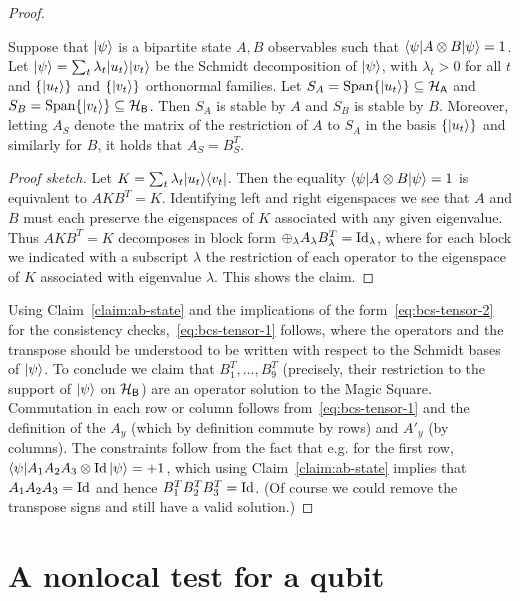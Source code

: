 \begin{proof}
\begin{claim}\label{claim:ab-state}
Suppose that $|\psi\rangle$ is a bipartite state $A,B$ observables such that $\langle\psi| A\otimes B |\psi\rangle = 1$. Let $|\psi\rangle = \sum_t \lambda_t |u_t\rangle |v_t\rangle$ be the Schmidt decomposition of $|\psi\rangle$, with $\lambda_t>0$ for all $t$ and $\{|u_t\rangle\}$ and $\{|v_t\rangle\}$ orthonormal families. Let  $S_A = \text{Span}\{|u_t\rangle\} \subseteq \mathcal{H}_{\textsf{A}}$ and $S_B=\text{Span}\{|v_t\rangle\} \subseteq \mathcal{H}_{\textsf{B}}$. Then $S_A$ is stable by $A$ and $S_B$ is stable by $B$. Moreover, letting $A_S$ denote the matrix of the restriction of $A$ to $S_A$ in the basis $\{|u_t\rangle\}$ and similarly for $B$, it holds that    $A_S=B_S^T$. 
\end{claim}

\begin{proof}[Proof sketch]
Let $K = \sum_t \lambda_t |u_t\rangle\langle v_t|$. Then the equality $\langle\psi| A\otimes B |\psi\rangle = 1$ is equivalent to $AKB^T = K$. Identifying left and right eigenspaces we see that $A$ and $B$ must each preserve the eigenspaces of $K$ associated with any given eigenvalue. Thus $AKB^T = K$ decomposes in block form $\oplus_\lambda  A_\lambda B_\lambda^T = \mathop{\rm Id}\nolimits_\lambda$, where for each block we indicated with a subscript $\lambda$ the restriction of each operator to the eigenspace of $K$ associated with eigenvalue $\lambda$. This shows the claim.  
\end{proof}

Using Claim~\ref{claim:ab-state} and the implications of the form~\eqref{eq:bcs-tensor-2} for the consistency checks,~\eqref{eq:bcs-tensor-1} follows, where the operators and the transpose should be understood to be written with respect to the Schmidt bases of $|\psi\rangle$. To conclude we claim that $B_1^T,\ldots,B_9^T$ (precisely, their restriction to the support of $|\psi\rangle$ on $\mathcal{H}_{\textsf{B}}$) are an operator solution to the Magic Square. Commutation in each row or column follows from~\eqref{eq:bcs-tensor-1} and the definition of the $A_y$ (which by definition commute by rows) and $A'_y$ (by columns). The constraints follow from the fact that e.g. for the first row, $\langle\psi| A_1 A_2 A_3 \otimes \mathop{\rm Id}\nolimits|\psi\rangle = +1$, which using Claim~\ref{claim:ab-state}  implies that $A_1A_2A_3 = \mathop{\rm Id}\nolimits$ and hence $B_1^T B_2^T B_3^T = \mathop{\rm Id}\nolimits$. (Of course we could remove the transpose signs and still have a valid solution.)
\end{proof}

\section{A nonlocal test for a qubit}

